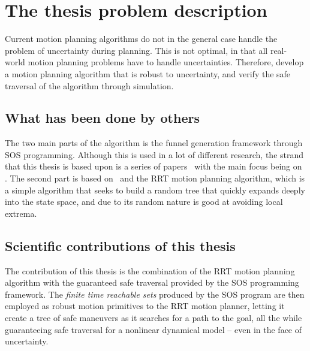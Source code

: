 \section{The thesis problem description}

Current motion planning algorithms do not in the general case handle the problem
of uncertainty during planning. This is not optimal, in that all real-world
motion planning problems have to handle uncertainties. Therefore, develop a
motion planning algorithm that is robust to uncertainty, and verify the safe
traversal of the algorithm through simulation.

\subsection{What has been done by others}

The two main parts of the \rrtfunnel{} algorithm is the funnel generation
framework through \ac{SOS} programming. Although this is used in a lot of
different research, the strand that this thesis is based upon is a series of
papers~\cite{Tobenkin_2011,tedrakeLQRtreesFeedbackMotion2009,majumdarRobustOnlineMotion2013,majumdarFunnelLibrariesRealtime2017,ahmadi2014dsos}
with the main focus being on \cite{majumdarFunnelLibrariesRealtime2017}. The
second part is based on~\textcite{article} and the \ac{RRT} motion planning
algorithm, which is a simple algorithm that seeks to build a random tree that
quickly expands deeply into the state space, and due to its random nature is
good at avoiding local extrema.

\subsection{Scientific contributions of this thesis}

The contribution of this thesis is the combination of the \ac{RRT} motion
planning algorithm with the guaranteed safe traversal provided by the \ac{SOS}
programming framework. The \textit{finite time reachable sets} produced by the
\ac{SOS} program are then employed as robust motion primitives to the \ac{RRT}
motion planner, letting it create a tree of safe maneuvers as it searches for a
path to the goal, all the while guaranteeing safe traversal for a nonlinear
dynamical model -- even in the face of uncertainty.
